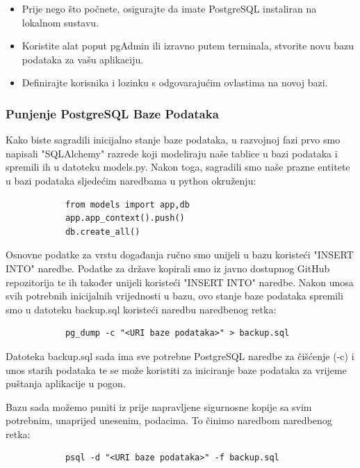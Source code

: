 			\begin{itemize}
					\item Prije nego što počnete, osigurajte da imate PostgreSQL instaliran na lokalnom sustavu.
					\item Koristite alat poput pgAdmin ili izravno putem terminala, stvorite novu bazu podataka za vašu aplikaciju.
					\item Definirajte korisnika i lozinku s odgovarajućim ovlastima na novoj bazi.
			\end{itemize}
			
			\subsubsection{Punjenje PostgreSQL Baze Podataka}
			
			Kako biste sagradili inicijalno stanje baze podataka, u razvojnoj fazi prvo smo napisali "SQLAlchemy" razrede koji modeliraju naše tablice u bazi podataka i spremili ih u datoteku models.py. Nakon toga, sagradili smo naše prazne entitete u bazi podataka sljedećim naredbama u python okruženju:
			
			\begin{verbatim}
			from models import app,db
			app.app_context().push()
			db.create_all()
			\end{verbatim}
			
			Osnovne podatke za vrstu događanja ručno smo unijeli u bazu koristeći "INSERT INTO" naredbe. Podatke za države kopirali smo iz javno dostupnog GitHub repozitorija te ih također unijeli koristeći "INSERT INTO" naredbe. Nakon unosa svih potrebnih inicijalnih vrijednosti u bazu, ovo stanje baze podataka spremili smo u datoteku backup.sql koristeći naredbu naredbenog retka:
			
			\begin{verbatim}
			pg_dump -c "<URI baze podataka>" > backup.sql
			\end{verbatim}
			
			Datoteka backup.sql sada ima sve potrebne PostgreSQL naredbe za čišćenje (-c) i unos starih podataka te se može koristiti za iniciranje baze podataka za vrijeme puštanja aplikacije u pogon.
			
			Bazu sada možemo puniti iz prije napravljene sigurnosne kopije sa svim potrebnim, unaprijed unesenim, podacima. To činimo naredbom naredbenog retka:
			
			\begin{verbatim}
			psql -d "<URI baze podataka>" -f backup.sql
			\end{verbatim}
			
